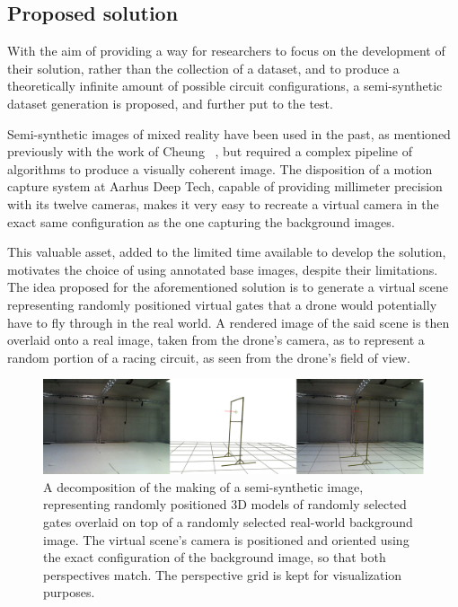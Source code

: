 \subsection{Proposed solution}

With the aim of providing a way for researchers to focus on the development of
their solution, rather than the collection of a dataset, and to produce a
theoretically infinite amount of possible circuit configurations, a
semi-synthetic dataset generation is proposed, and further put to the test.

Semi-synthetic images of mixed reality have been used in the past, as mentioned
previously with the work of Cheung \etal~\cite{CheungWBM17}, but required a
complex pipeline of algorithms to produce a visually coherent image. The
disposition of a motion capture system at Aarhus Deep Tech, capable of
providing millimeter precision with its twelve cameras, makes it very easy to
recreate a virtual camera in the exact same configuration as the one capturing
the background images.

This valuable asset, added to the limited time available to develop the
solution, motivates the choice of using annotated base images, despite their
limitations.\\

The idea proposed for the aforementioned solution is to generate a virtual
scene representing randomly positioned virtual gates that a drone would
potentially have to fly through in the real world. A rendered image of the said
scene is then overlaid onto a real image, taken from the drone's camera, as to
represent a random portion of a racing circuit, as seen from the drone's field
of view. 

\begin{figure}[h]
	\center
	\includegraphics[width=\textwidth]{figure/dataset_solution.png}
	\caption[The steps of a semi-synthetic image generation.]{A decomposition
	of the making of a semi-synthetic image, representing randomly positioned
	3D models of randomly selected gates overlaid on top of a randomly selected
	real-world background image. The virtual scene's camera is positioned and
	oriented using the exact configuration of the background image, so that
	both perspectives match. The perspective grid is kept for visualization
	purposes.}
\end{figure}

